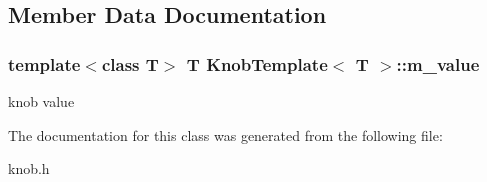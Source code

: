 \subsection{Member Data Documentation}
\hypertarget{classKnobTemplate_a39c36d8924757ad7ef98e51eecadc033}{
\subsubsection[{m\_\-value}]{\setlength{\rightskip}{0pt plus 5cm}template$<$class T$>$ T {\bf KnobTemplate}$<$ T $>$::{\bf m\_\-value}}}
\label{classKnobTemplate_a39c36d8924757ad7ef98e51eecadc033}
knob value 

The documentation for this class was generated from the following file:\begin{DoxyCompactItemize}
\item 
knob.h\end{DoxyCompactItemize}
